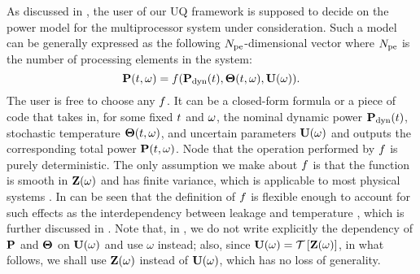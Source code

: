 As discussed in , the user of our UQ framework is supposed to decide on the power model for the multiprocessor system under consideration. Such a model can be generally expressed as the following ${N_\text{pe}}$-dimensional vector where ${N_\text{pe}}$ is the number of processing elements in the system:
\begin{equation} \elabel{power-model}
  \vP(\t, \o) = \f(\vP_\dyn(\t), \vTO(\t, \o), \vU(\o)).
\end{equation}
The user is free to choose any $f$. It can be a closed-form formula or a piece of code that takes in, for some fixed $t$ and $\omega$, the nominal dynamic power $\mathbf{P}_{\text{dyn}}(t)$, stochastic temperature ${\boldsymbol\Theta}(t, \omega)$, and uncertain parameters $\mathbf{U}(\omega)$ and outputs the corresponding total power $\mathbf{P}(t, \omega)$. Node that the operation performed by $f$ is purely deterministic. The only assumption we make about $f$ is that the function is smooth in $\mathbf{Z}(\omega)$ and has finite variance, which is applicable to most physical systems \cite{xiu2002}. In can be seen that the definition of $f$ is flexible enough to account for such effects as the interdependency between leakage and temperature \cite{srivastava2010, liu2007}, which is further discussed in . Note that, in , we do not write explicitly the dependency of $\mathbf{P}$ and ${\boldsymbol\Theta}$ on $\mathbf{U}(\omega)$ and use $\omega$ instead; also, since $\vU(\o) = \oTransform{\vZ(\o)}$, in what follows, we shall use $\mathbf{Z}(\omega)$ instead of $\mathbf{U}(\omega)$, which has no loss of generality.
